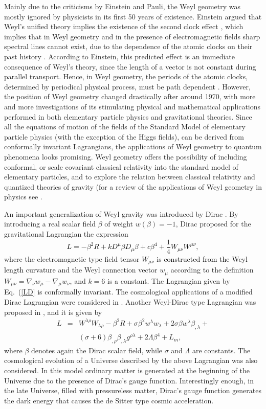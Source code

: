 \documentclass[aps,superscriptaddress, showpacs,preprintnumbers, superscriptaddress, nofootinbibt,twocolumn]{revtex4}
\def\be{\begin{equation}}
\def\ee{\end{equation}}
\def\bea{\begin{eqnarray}}
\def\eea{\end{eqnarray}}
\newcommand{\te}[1]{\textcolor{black}{#1}}
\begin{document}
Mainly due to the criticisms by Einstein and Pauli, the Weyl geometry was mostly ignored by physicists in its first 50 years of existence.  Einstein argued that Weyl's unified theory implies the existence of the second clock
effect \cite{Str}, which implies that in Weyl geometry and in the
presence of electromagnetic fields sharp spectral lines  cannot exist, due to the dependence of the atomic clocks on their past history \cite{Str}.
According to Einstein, this predicted effect is an immediate consequence of Weyl’s theory, since the length of a vector is not constant during parallel transport. Hence, in Weyl geometry, the periods of the atomic clocks, determined by periodical physical process, must be path dependent \cite{Str}.
However,  the position of Weyl geometry changed drastically after around 1970, with more and more investigations of its stimulating physical and mathematical applications performed in both elementary particle physics and gravitational theories. Since all the equations of motion of the fields of the Standard Model of elementary particle physics (with the exception of the Higgs fields), can be derived from conformally invariant Lagrangians, the applications of Weyl geometry to quantum phenomena looks promising. Weyl geometry offers the possibility of including conformal, or scale covariant classical relativity into the standard model of elementary particles, and to explore the relation between classical relativity and quantized theories of gravity (for a review of the applications of Weyl geometry in physics see \cite{Scholz}.

 An important generalization of Weyl gravity was introduced by Dirac \cite{Dirac1,Dirac2}. By introducing a real scalar field $\beta$ of weight $w(\beta)=-1$,  Dirac proposed for the gravitational Lagrangian the expression
\te{ \be\label{LD}
 L=-\beta ^2R+kD^{\mu}\beta D_{\mu}\beta +c\beta ^4+\frac{1}{4}W_{\mu \nu}W^{\mu \nu},
 \ee}
 where the electromagnetic type field tensor \te{$W_{\mu \nu}$ is constructed from the Weyl length curvature} and the Weyl connection vector $w_{\mu}$ according to the definition $W_{\mu \nu}=\nabla _{\nu}w_{\mu}-\nabla_{\mu}w_{\nu}$, and $k=6$ is a constant. The Lagrangian given by Eq.~(\ref{LD} is conformally invariant. The cosmological applications of a modified Dirac Lagrangian were considered in \cite{Rosen}. Another Weyl-Dirac type Lagrangian was proposed in \cite{Isrcosm}, and it is given by
 \bea
 L&=&W^{\lambda \rho}W_{\lambda \rho}-\beta ^2R+\sigma \beta ^2w^{\lambda}w_{\lambda}+2\sigma \beta w^{\lambda}\beta _{,\lambda}+\nonumber\\
&& (\sigma +6)\beta _{,\rho}\beta_{,\lambda }g^{\rho \lambda}+2\Lambda \beta ^4+L_m,
 \eea
 where $\beta $ denotes again the Dirac scalar field, while $\sigma$ and $\Lambda$ are constants. The cosmological evolution of a Universe described by the above Lagrangian was also considered.  In this model ordinary matter is generated at the beginning of the Universe due to the presence of Dirac’s gauge function. Interestingly enough, in the late Universe, filled with pressureless matter, Dirac’s gauge function generates the dark energy that causes the de Sitter type cosmic acceleration.
\end{document}
